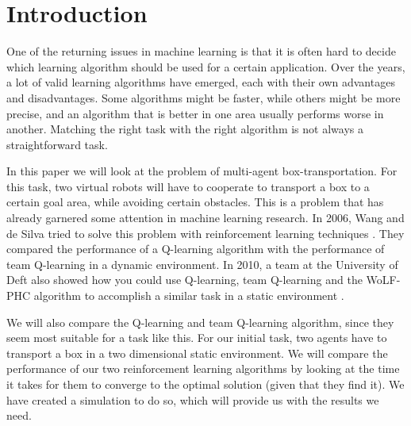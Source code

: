 \section{Introduction}
One of the returning issues in machine learning is that it is often hard to decide which learning algorithm should be used for a certain application. Over the years, a lot of valid learning algorithms have emerged, each with their own advantages and disadvantages. Some algorithms might be faster, while others might be more precise, and an algorithm that is better in one area usually performs worse in another. Matching the right task with the right algorithm is not always a straightforward task.

In this paper we will look at the problem of multi-agent box-transportation.  For this task, two virtual robots will have to cooperate to transport a box to a certain goal area, while avoiding certain obstacles. This is a problem that has already garnered some attention in machine learning research. In 2006, Wang and de Silva tried to solve this problem with reinforcement learning techniques \cite{wang2006}. They compared the performance of a Q-learning algorithm with the performance of team Q-learning in a dynamic environment. In 2010, a team at the University of Deft also showed how you could use Q-learning, team Q-learning and the WoLF-PHC algorithm to accomplish a similar task in a static environment \cite{busoniu2010}.

We will also compare the Q-learning and team Q-learning algorithm, since they seem most suitable for a task like this. For our initial task, two agents have to transport a box in a two dimensional static environment. We will compare the performance of our two reinforcement learning algorithms by looking at the time it takes for them to converge to the optimal solution (given that they find it). We have created a simulation to do so, which will provide us with the results we need.
